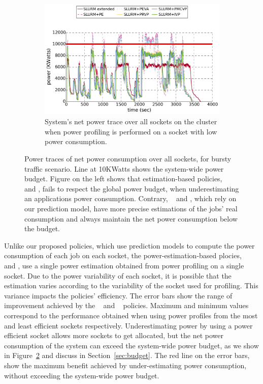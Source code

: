 \begin{figure}[p]
	\begin{subfigure}[b]{.9\textwidth}
   	\includegraphics[width=\textwidth]{power_aware_job_scheduling/figures/net_power_trace_under_estimate}
    \caption{System's net power trace over all sockets on the cluster when power profiling is performed on a socket with low power consumption.}
  	\label{fig:net_power_trace_under_estimation}
  \end{subfigure}%

  \caption{Power traces of net power consumption over all sockets, for bursty traffic scenario. Line at 10KWatts shows the system-wide power budget.  Figure on the left shows that estimation-based policies, 
								\PESched~ and \PEVASched, fails to respect the global power budget, when underestimating an applications power consumption.  Contrary, \PRVSSched~ and \PMCVSSched, 
								which rely on our prediction model, have more precise estimations of the jobs' real consumption and always maintain the net power consumption below the budget.}
        \label{fig:net_power_trace_under_estimate}
       \vspace{.5cm}
\end{figure}



Unlike our proposed policies, which use prediction models to compute the power 
consumption of each job on each socket, the power-estimation-based plocies, \PESched~ and \PEVASched, use a single power estimation obtained from power profiling on a single socket.  
Due to the power variability of each socket, it is possible that the estimation varies according to the variability of the socket used for profiling.
This variance impacts the policies' efficiency. 
The error bars show the range of improvement achieved by the \PESched~ and \PEVASched~ policies.  
Maximum and minimum values correspond to the performance obtained 
when using power profiles from the most and least efficient sockets respectively.     
Underestimating power by using a power efficient socket allows more sockets to get allocated, but the net power consumption of the system can exceed the system-wide power budget, as we show in Figure~\ref{fig:net_power_trace_under_estimate} and discuss in Section~\ref{sec:budget}. 
The red line on the error bars, show the maximum benefit achieved by under-estimating power consumption, without exceeding the 
system-wide power budget.

